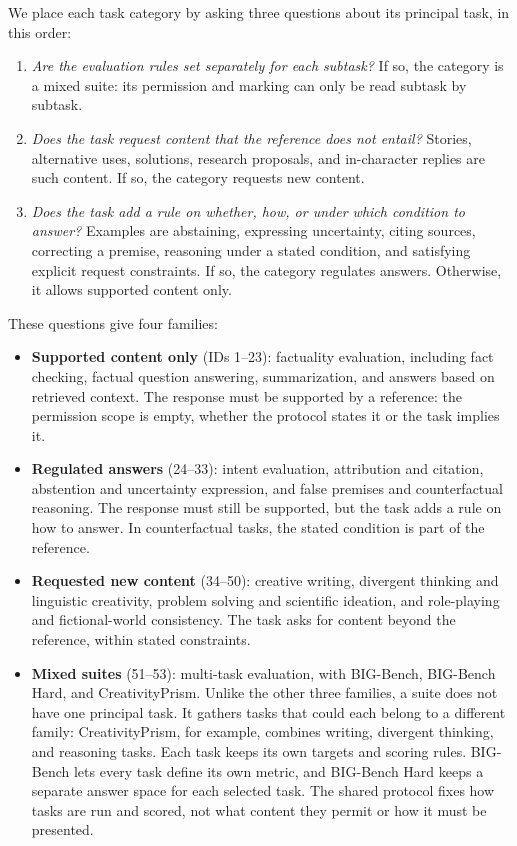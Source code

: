 \documentclass{clv2025}
\begin{document}
We place each task category by asking three questions about its principal
task, in this order:
\begin{enumerate}
\item \emph{Are the evaluation rules set separately for each subtask?}
If so, the category is a mixed suite: its permission and marking can only
be read subtask by subtask.
\item \emph{Does the task request content that the reference does not
entail?} Stories, alternative uses, solutions, research proposals, and
in-character replies are such content. If so, the category requests new
content.
\item \emph{Does the task add a rule on whether, how, or under which
condition to answer?} Examples are abstaining, expressing uncertainty,
citing sources, correcting a premise, reasoning under a stated condition,
and satisfying explicit request constraints. If so, the category regulates
answers. Otherwise, it allows supported content only.
\end{enumerate}

These questions give four families:
\begin{itemize}
\item \textbf{Supported content only} (IDs 1--23): factuality evaluation,
including fact checking, factual question answering, summarization, and
answers based on retrieved context. The response must be supported by a
reference: the permission scope is empty, whether the protocol states it
or the task implies it.
\item \textbf{Regulated answers} (24--33): intent evaluation, attribution
and citation, abstention and uncertainty expression, and false premises and
counterfactual reasoning. The response must still be supported, but the
task adds a rule on how to answer. In counterfactual tasks, the stated
condition is part of the reference.
\item \textbf{Requested new content} (34--50): creative writing, divergent
thinking and linguistic creativity, problem solving and scientific
ideation, and role-playing and fictional-world consistency. The task asks
for content beyond the reference, within stated constraints.
\item \textbf{Mixed suites} (51--53): multi-task evaluation, with
BIG-Bench, BIG-Bench Hard, and CreativityPrism. Unlike the other three
families, a suite does not have one principal task. It gathers tasks that
could each belong to a different family: CreativityPrism, for example,
combines writing, divergent thinking, and reasoning tasks. Each task keeps
its own targets and scoring rules. BIG-Bench lets every task define its own
metric, and BIG-Bench Hard keeps a separate answer space for each selected
task. The shared protocol fixes how tasks are run and scored, not what
content they permit or how it must be presented.
\end{itemize}
\end{document}
